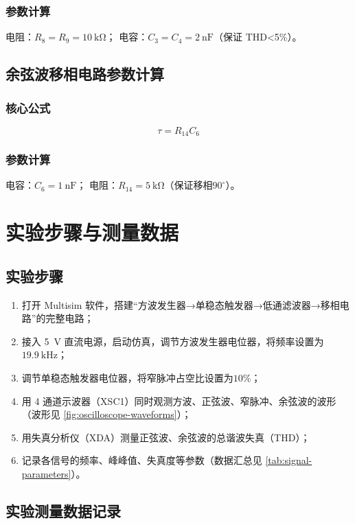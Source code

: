 \documentclass[twoside]{article}
\begin{document}
\subsubsection{参数计算}
电阻：$R_8=R_9=\SI{10}{\kilo\ohm}$；
电容：$C_3=C_4=\SI{2}{\nano\farad}$（保证 THD<5\%）。
\label{sec:filter-calc}

\subsection{余弦波移相电路参数计算}
\subsubsection{核心公式}
\[ \tau = R_{14}C_6 \]

\subsubsection{参数计算}
电容：$C_6=\SI{1}{\nano\farad}$；
电阻：$R_{14}=\SI{5}{\kilo\ohm}$（保证移相$90^\circ$）。
\label{sec:phase-shift-calc}

\section{实验步骤与测量数据}

\subsection{实验步骤}
\begin{enumerate}[label=\arabic*., leftmargin=2em, itemsep=0.3em]
    \item 打开 Multisim 软件，搭建“方波发生器→单稳态触发器→低通滤波器→移相电路”的完整电路；
    \item 接入 \SI{+5}{\volt} 直流电源，启动仿真，调节方波发生器电位器，将频率设置为$\SI{19.9}{\kilo\hertz}$；
    \item 调节单稳态触发器电位器，将窄脉冲占空比设置为$10\%$；
    \item 用 4 通道示波器（XSC1）同时观测方波、正弦波、窄脉冲、余弦波的波形（波形见 \ref{fig:oscilloscope-waveforms}）；
    \item 用失真分析仪（XDA）测量正弦波、余弦波的总谐波失真（THD）；
    \item 记录各信号的频率、峰峰值、失真度等参数（数据汇总见 \ref{tab:signal-parameters}）。
\end{enumerate}
\label{sec:experimental-steps}

\subsection{实验测量数据记录}
\end{document}
